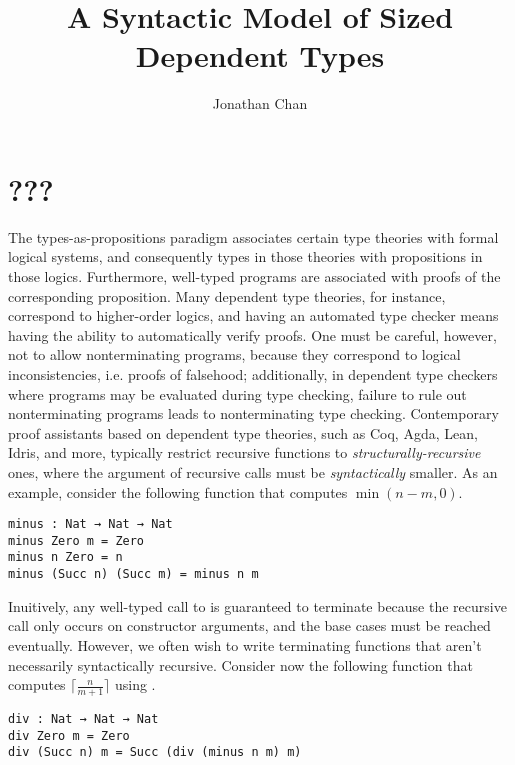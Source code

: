 \documentclass[acmsmall,nonacm]{acmart}
\author{Jonathan Chan}
\title{A Syntactic Model of Sized Dependent Types}
\newcommand{\α}{\alpha}
\newcommand{\β}{\beta}
\newcommand{\γ}{\gamma}
\newcommand{\σ}{\sigma}
\newcommand{\Γ}{\Gamma}
\newcommand{\Λ}{\Lambda}
\newcommand{\∀}{\forall}
\newcommand{\↑}{\uparrow}
\newcommand{\⊢}{\vdash}
\newcommand{\↦}{\mapsto}
\newcommand{\⊳}{\rhd}
\begin{document}
\maketitle

\section{???}

The types-as-propositions paradigm associates certain type theories with formal logical systems,
and consequently types in those theories with propositions in those logics.
Furthermore, well-typed programs are associated with proofs of the corresponding proposition.
Many dependent type theories, for instance, correspond to higher-order logics,
and having an automated type checker means having the ability to automatically verify proofs.
One must be careful, however, not to allow nonterminating programs,
because they correspond to logical inconsistencies, i.e. proofs of falsehood;
additionally, in dependent type checkers where programs may be evaluated during type checking,
failure to rule out nonterminating programs leads to nonterminating type checking.
Contemporary proof assistants based on dependent type theories, such as Coq, Agda, Lean, Idris,
and more, typically restrict recursive functions to \emph{structurally-recursive} ones,
where the argument of recursive calls must be \emph{syntactically} smaller.
As an example, consider the following function  that computes $\min(n - m, 0)$.

\begin{verbatim}
minus : Nat → Nat → Nat
minus Zero m = Zero
minus n Zero = n
minus (Succ n) (Succ m) = minus n m
\end{verbatim}

Inuitively, any well-typed call to  is guaranteed to terminate because the recursive call
only occurs on constructor arguments, and the base cases must be reached eventually.
However, we often wish to write terminating functions that aren't necessarily syntactically recursive.
Consider now the following function  that computes $\big\lceil\frac{n}{m+1}\big\rceil$ using .

\begin{verbatim}
div : Nat → Nat → Nat
div Zero m = Zero
div (Succ n) m = Succ (div (minus n m) m)
\end{verbatim}
\end{document}
